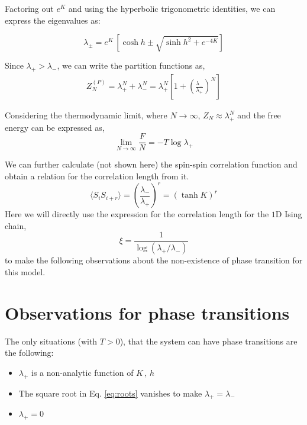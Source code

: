 \documentclass[11pt,a4paper]{article}
\begin{document}
Factoring out $e^K$ and using the hyperbolic trigonometric identities, we can express the eigenvalues as:

\begin{equation}
    \lambda_{\pm} = e^K \, \left[ \cosh{h} \pm \sqrt{\sinh{h}^2 + e^{-4K}} \right] \label{eq:roots}
\end{equation}

Since $\lambda_+ > \lambda_-$, we can write the partition functions as,
\begin{align}
    Z^{(P)}_N = \lambda^N_+ + \lambda^N_-  = \lambda^N_+ \left[ 1 + \left(\frac{\lambda_- }{\lambda_+ }\right)^N \right]
\end{align}

Considering the thermodynamic limit, where $N \to \infty$,  $Z_N \approx \lambda^N_+$ and the free energy can be expressed as,
\begin{equation}
    \lim_{N \to \infty} \frac{F}{N} = -T \log \lambda_+
\end{equation}

We can further calculate (not shown here) the spin-spin correlation function and obtain a relation for the correlation length from it. 
\begin{equation}
    \langle S_i S_{i+r} \rangle = \left( \frac{\lambda_-}{\lambda_+} \right)^r = (\tanh K)^r
\end{equation}
Here we will directly use the expression for the correlation length for the $1$D Ising chain,
\begin{equation}
    \xi = \frac{1}{\log (\lambda_+ / \lambda_-)}
\end{equation}
to make the following observations about the non-existence of phase transition for this model.

\section{Observations for phase transitions}
The only situations (with $T>0$), that the system can have phase transitions are the following:

\begin{itemize}
    \item $\lambda_+$ is a non-analytic function of $K \,,\, h$
    \item The square root in Eq. \ref{eq:roots} vanishes to make $\lambda_+ = \lambda_-$
    \item $\lambda_+ = 0$ 
\end{itemize}
\end{document}
